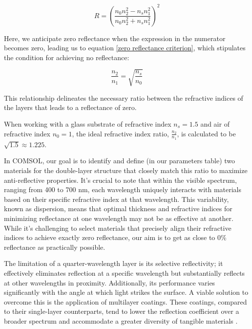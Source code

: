 \begin{equation}\label{reflectance for 2-layer antireflecting films - chap4}
    R = \left(\frac{n_0n_2^2 - n_sn_1^2}{n_0n_2^2 + n_sn_1^2}\right)^2
\end{equation}

Here, we anticipate zero reflectance when the expression in the numerator becomes zero, leading us to equation \ref{zero reflectance criterion}, which stipulates the condition for achieving no reflectance:

\begin{equation}\label{zero reflectance criterion - chap4}
    \frac{n_2}{n_1} = \sqrt{\frac{n_s}{n_0}}
\end{equation}

This relationship delineates the necessary ratio between the refractive indices of the layers that leads to a reflectance of zero.

When working with a glass substrate of refractive index $n_s = 1.5$ and air of refractive index $n_0 = 1$, the ideal refractive index ratio, $\frac{n_2}{n_1}$, is calculated to be $\sqrt{1.5} \approx 1.225$.

In COMSOL, our goal is to identify and define (in our parameters table) two materials for the double-layer structure that closely match this ratio to maximize anti-reflective properties. It's crucial to note that within the visible spectrum, ranging from 400 to 700 nm, each wavelength uniquely interacts with materials based on their specific refractive index at that wavelength. This variability, known as dispersion, means that optimal thickness and refractive indices for minimizing reflectance at one wavelength may not be as effective at another. While it's challenging to select materials that precisely align their refractive indices to achieve exactly zero reflectance, our aim is to get as close to 0\% reflectance as practically possible.

The limitation of a quarter-wavelength layer is its selective reflectivity; it effectively eliminates reflection at a specific wavelength but substantially reflects at other wavelengths in proximity. Additionally, its performance varies significantly with the angle at which light strikes the surface. A viable solution to overcome this is the application of multilayer coatings. These coatings, compared to their single-layer counterparts, tend to lower the reflection coefficient over a broader spectrum and accommodate a greater diversity of tangible materials \cite{pedrotti_introduction_2007}.

